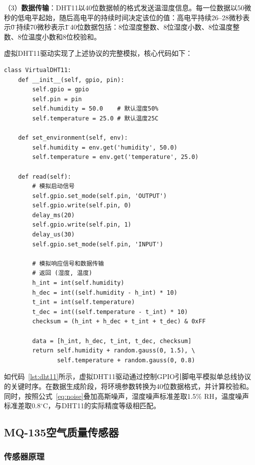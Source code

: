 \documentclass[12pt,a4paper]{ctexart}
\begin{document}
（3）\textbf{数据传输}：DHT11以40位数据帧的格式发送温湿度信息。每一位数据以50微秒的低电平起始，随后高电平的持续时间决定该位的值：高电平持续26--28微秒表示\"0\"，持续70微秒表示\"1\"。40位数据包括：8位湿度整数、8位湿度小数、8位温度整数、8位温度小数和8位校验和。

虚拟DHT11驱动实现了上述协议的完整模拟，核心代码如下：

\begin{lstlisting}[caption={DHT11启动信号与数据读取},label={lst:dht11}]
class VirtualDHT11:
    def __init__(self, gpio, pin):
        self.gpio = gpio
        self.pin = pin
        self.humidity = 50.0    # 默认湿度50%
        self.temperature = 25.0 # 默认温度25C
    
    def set_environment(self, env):
        self.humidity = env.get('humidity', 50.0)
        self.temperature = env.get('temperature', 25.0)
    
    def read(self):
        # 模拟启动信号
        self.gpio.set_mode(self.pin, 'OUTPUT')
        self.gpio.write(self.pin, 0)
        delay_ms(20)
        self.gpio.write(self.pin, 1)
        delay_us(30)
        self.gpio.set_mode(self.pin, 'INPUT')
        
        # 模拟响应信号和数据传输
        # 返回 (湿度, 温度)
        h_int = int(self.humidity)
        h_dec = int((self.humidity - h_int) * 10)
        t_int = int(self.temperature)
        t_dec = int((self.temperature - t_int) * 10)
        checksum = (h_int + h_dec + t_int + t_dec) & 0xFF
        
        data = [h_int, h_dec, t_int, t_dec, checksum]
        return self.humidity + random.gauss(0, 1.5), \
               self.temperature + random.gauss(0, 0.8)
\end{lstlisting}

如代码~\ref{lst:dht11}所示，虚拟DHT11驱动通过控制GPIO引脚电平模拟单总线协议的关键时序。在数据生成阶段，将环境参数转换为40位数据格式，并计算校验和。同时，按照公式~\ref{eq:noise}叠加高斯噪声，湿度噪声标准差取1.5\% RH，温度噪声标准差取0.8$^\circ$C，与DHT11的实际精度等级相匹配。

\subsection{MQ-135空气质量传感器}

\subsubsection{传感器原理}
\end{document}
